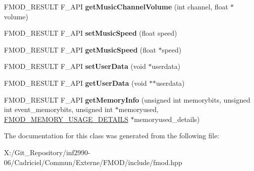 \begin{DoxyCompactItemize}
\item 
\hypertarget{class_f_m_o_d_1_1_sound_afc1ef61ba84190294a6b1f1f0fd3ab64}{F\-M\-O\-D\-\_\-\-R\-E\-S\-U\-L\-T F\-\_\-\-A\-P\-I {\bfseries get\-Music\-Channel\-Volume} (int channel, float $\ast$volume)}\label{class_f_m_o_d_1_1_sound_afc1ef61ba84190294a6b1f1f0fd3ab64}

\item 
\hypertarget{class_f_m_o_d_1_1_sound_af5fe3deac71212ab13531a7bec20c918}{F\-M\-O\-D\-\_\-\-R\-E\-S\-U\-L\-T F\-\_\-\-A\-P\-I {\bfseries set\-Music\-Speed} (float speed)}\label{class_f_m_o_d_1_1_sound_af5fe3deac71212ab13531a7bec20c918}

\item 
\hypertarget{class_f_m_o_d_1_1_sound_a22e4865bfd9f4bf40633671439dade82}{F\-M\-O\-D\-\_\-\-R\-E\-S\-U\-L\-T F\-\_\-\-A\-P\-I {\bfseries get\-Music\-Speed} (float $\ast$speed)}\label{class_f_m_o_d_1_1_sound_a22e4865bfd9f4bf40633671439dade82}

\item 
\hypertarget{class_f_m_o_d_1_1_sound_ac921f8c260ef5b396a837016d5882713}{F\-M\-O\-D\-\_\-\-R\-E\-S\-U\-L\-T F\-\_\-\-A\-P\-I {\bfseries set\-User\-Data} (void $\ast$userdata)}\label{class_f_m_o_d_1_1_sound_ac921f8c260ef5b396a837016d5882713}

\item 
\hypertarget{class_f_m_o_d_1_1_sound_a829f8e68b254764374c38e6e23f7f8df}{F\-M\-O\-D\-\_\-\-R\-E\-S\-U\-L\-T F\-\_\-\-A\-P\-I {\bfseries get\-User\-Data} (void $\ast$$\ast$userdata)}\label{class_f_m_o_d_1_1_sound_a829f8e68b254764374c38e6e23f7f8df}

\item 
\hypertarget{class_f_m_o_d_1_1_sound_abf8d14ac330b572417f9f949456848d5}{F\-M\-O\-D\-\_\-\-R\-E\-S\-U\-L\-T F\-\_\-\-A\-P\-I {\bfseries get\-Memory\-Info} (unsigned int memorybits, unsigned int event\-\_\-memorybits, unsigned int $\ast$memoryused, \hyperlink{struct_f_m_o_d___m_e_m_o_r_y___u_s_a_g_e___d_e_t_a_i_l_s}{F\-M\-O\-D\-\_\-\-M\-E\-M\-O\-R\-Y\-\_\-\-U\-S\-A\-G\-E\-\_\-\-D\-E\-T\-A\-I\-L\-S} $\ast$memoryused\-\_\-details)}\label{class_f_m_o_d_1_1_sound_abf8d14ac330b572417f9f949456848d5}

\end{DoxyCompactItemize}


The documentation for this class was generated from the following file\-:\begin{DoxyCompactItemize}
\item 
X\-:/\-Git\-\_\-\-Repository/inf2990-\/06/\-Cadriciel/\-Commun/\-Externe/\-F\-M\-O\-D/include/fmod.\-hpp\end{DoxyCompactItemize}
